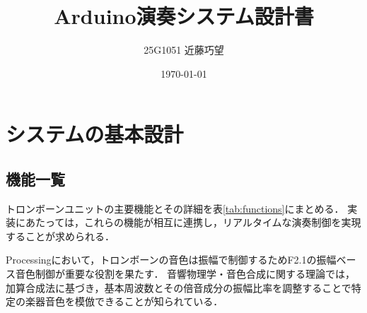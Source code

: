 \documentclass[uplatex,dvipdfmx]{jsarticle}
\begin{document}
\title{\textbf{Arduino演奏システム設計書}}
\author{25G1051 近藤巧望}
\date{\today}
\maketitle

\section{\textbf{システムの基本設計}}

\subsection{\textbf{機能一覧}}

トロンボーンユニットの主要機能とその詳細を表\ref{tab:functions}にまとめる．
実装にあたっては，これらの機能が相互に連携し，リアルタイムな演奏制御を実現することが求められる．

Processingにおいて，トロンボーンの音色は振幅で制御するためF2.1の振幅ベース音色制御が重要な役割を果たす．
音響物理学・音色合成に関する理論では，加算合成法に基づき，基本周波数とその倍音成分の振幅比率を調整することで特定の楽器音色を模倣できることが知られている\cite{AdditiveSynthesis}．
\end{document}
